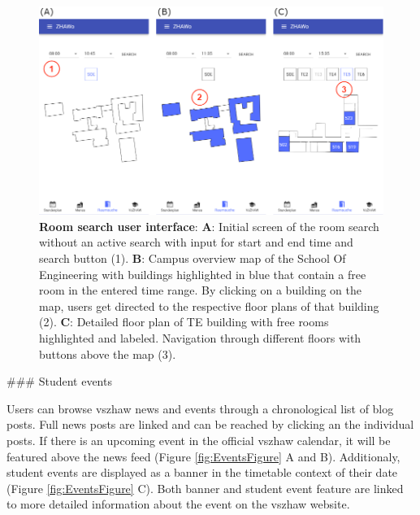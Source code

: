 \begin{markdown}
\begin{figure}[H]
  \includegraphics[width=16cm, center]{./figures/roomsearch_figure1.png}
  \captionsetup{width=15.5cm}
  \caption[Room search user interface]{\textbf{Room search user interface}: \textbf{A}: Initial screen of the room search without an active search with input for start and end time and search button (1). \textbf{B}: Campus overview map of the School Of Engineering with buildings highlighted in blue that contain a free room in the entered time range. By clicking on a building on the map, users get directed to the respective floor plans of that building (2). \textbf{C}: Detailed floor plan of TE building with free rooms highlighted and labeled. Navigation through different floors with buttons above the map (3).}
  \label{fig:RoomSearchFigure}
\end{figure}

### Student events

Users can browse vszhaw news and events through a chronological list of blog posts. Full news posts are linked and can be reached by clicking an the individual posts. If there is an upcoming event in the official vszhaw calendar, it will be featured above the news feed (Figure \ref{fig:EventsFigure} A and B). Additionaly, student events are displayed as a banner in the timetable context of their date (Figure \ref{fig:EventsFigure} C). Both banner and student event feature are linked to more detailed information about the event on the vszhaw website.


\end{markdown}
